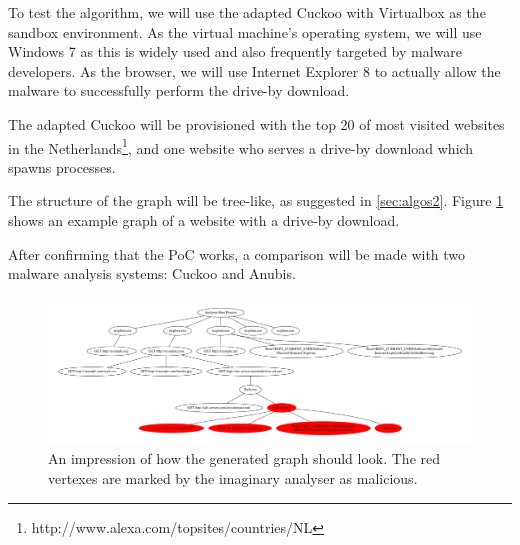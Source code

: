 To test the algorithm, we will use the adapted Cuckoo with Virtualbox as the sandbox environment. As the virtual machine's operating system, we will use Windows 7 as this is widely used and also frequently targeted by malware developers. As the browser, we will use Internet Explorer 8 to actually allow the malware to successfully perform the drive-by download.

The adapted Cuckoo will be provisioned with the top 20 of most visited websites in the Netherlands\footnote{http://www.alexa.com/topsites/countries/NL}, and one website who serves a drive-by download which spawns processes.

The structure of the graph will be tree-like, as suggested in \ref{sec:algos2}. Figure \ref{fig:alg_tree} shows an example graph of a website with a drive-by download.

After confirming that the PoC works, a comparison will be made with two malware analysis systems: Cuckoo and Anubis.

\pagebreak

\begin{figure}[h]
    \centering
    \centerline{\includegraphics[width=25cm,angle=90]{Images/alg_tree}}
    \caption{An impression of how the generated graph should look. The red vertexes are marked by the imaginary analyser as malicious.}
    \label{fig:alg_tree}
\end{figure}

\pagebreak

\restoregeometry
{}
\setcounter{page}{\thesavepage}

